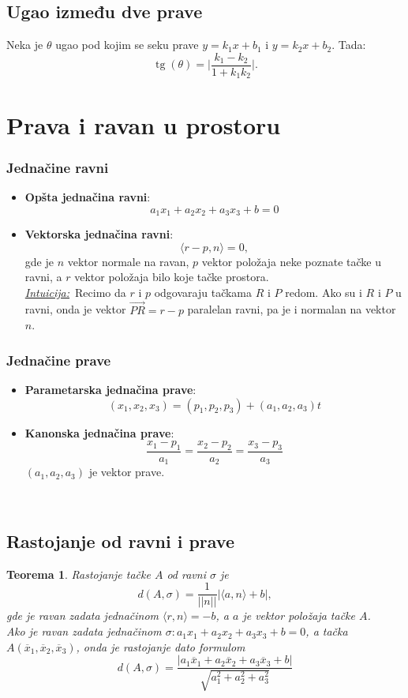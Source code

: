 \documentclass[a4paper,12pt,twoside]{report}
\newtheorem{theorem}{Teorema}[section]
\numberwithin{algorithm}{section}
\renewcommand{\tan}{\operatorname{tg}}
\newcommand{\intuicija}{\noindent\underline{\textit{Intuicija:}}\ }
\begin{document}
\subsection{Ugao između dve prave}
Neka je $\theta$ ugao pod kojim se seku prave $y = k_1x+b_1$ i $y = k_2x+b_2$. Tada:
\[
    \tan(\theta) = \bigg|\frac{k_1-k_2}{1+k_1k_2}\bigg|.
\]
\newpage

\section{Prava i ravan u prostoru}

\subsubsection*{Jednačine ravni}
\begin{itemize}
    \item \textbf{Opšta jednačina ravni}:
    \[ a_1x_1 + a_2x_2 + a_3x_3 + b = 0 \]
    \item \textbf{Vektorska jednačina ravni}:
    \[ \langle r - p, n \rangle = 0, \]
    gde je $n$ vektor normale na ravan, $p$ vektor položaja neke poznate tačke u ravni, a $r$ vektor položaja bilo koje tačke prostora.\\
    \intuicija Recimo da $r$ i $p$ odgovaraju tačkama $R$ i $P$ redom. Ako su i $R$ i $P$ u ravni, onda je vektor $\overrightarrow{PR} = r - p$ paralelan ravni, pa je i normalan na vektor $n$.
\end{itemize}
\subsubsection*{Jednačine prave}
\begin{itemize}
    \item \textbf{Parametarska jednačina prave}:
    \[ (x_1, x_2, x_3) = (p_1, p_2, p_3) + (a_1, a_2, a_3)t \]
    \item \textbf{Kanonska jednačina prave}:
    \[ \frac{x_1 - p_1}{a_1} = \frac{x_2 - p_2}{a_2} = \frac{x_3 - p_3}{a_3} \]
    $(a_1, a_2, a_3)$ je vektor prave.
\end{itemize}\
\subsection{Rastojanje od ravni i prave}
\begin{theorem}
    Rastojanje tačke $A$ od ravni $\sigma$ je 
    \[ d(A, \sigma) = \frac{1}{||n||}|\langle a, n \rangle + b|,  \]
    gde je ravan zadata jednačinom $\langle r, n \rangle = -b$, a $a$ je vektor položaja tačke $A$. \\Ako je ravan zadata
    jednačinom $\sigma: a_1x_1 + a_2x_2 + a_3x_3 + b = 0$, a tačka $A(\overline{x}_1, \overline{x}_2, \overline{x}_3)$, onda 
    je rastojanje dato formulom
    \[ d(A, \sigma) = \frac{|a_1\overline{x}_1 + a_2\overline{x}_2 + a_3\overline{x}_3 + b|}{\sqrt{a_1^2 + a_2^2 + a_3^2}} \]
\end{theorem}
\end{document}
